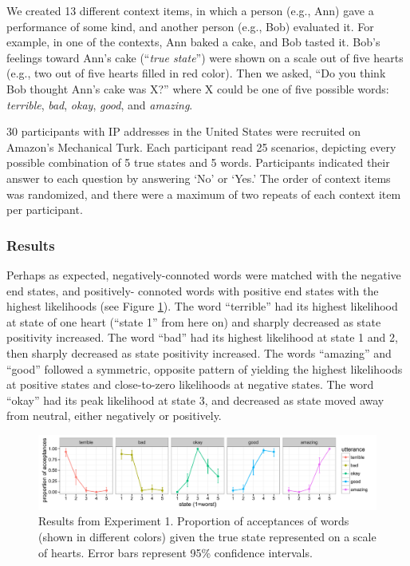\documentclass[10pt,letterpaper]{article}
\begin{document}
We created 13 different context items, in which a person (e.g., Ann) gave a performance of some kind, and another person (e.g., Bob) evaluated it. For example, in one of the contexts, Ann baked a cake, and Bob tasted it. Bob's feelings toward Ann's cake (``\emph{true state}'') were shown on a scale out of five hearts (e.g., two out of five hearts filled in red color). Then we asked, ``Do you think Bob thought Ann's cake was X?'' where X could be one of five possible words: \emph{terrible}, \emph{bad}, \emph{okay}, \emph{good}, and \emph{amazing}.

30 participants with IP addresses in the United States were recruited on Amazon's Mechanical Turk. Each participant read 25 scenarios, depicting every possible combination of 5 true states and 5 words. Participants indicated their answer to each question by answering `No' or `Yes.' The order of context items was randomized, and there were a maximum of two repeats of each context item per participant.

\subsubsection{Results}

Perhaps as expected, negatively-connoted words were matched with the negative end states, and positively- connoted words with positive end states with the highest likelihoods (see Figure \ref{fig:exp1}). The word ``terrible'' had its highest likelihood at state of one heart (``state 1'' from here on) and sharply decreased as state positivity increased. The word ``bad'' had its highest likelihood at state 1 and 2, then sharply decreased as state positivity increased. The words ``amazing'' and ``good'' followed a symmetric, opposite pattern of yielding the highest likelihoods at positive states and close-to-zero likelihoods at negative states. The word ``okay'' had its peak likelihood at state 3, and decreased as state moved away from neutral, either negatively or positively.

\begin{figure}[t]
\begin{center} 
  \includegraphics[width=.9\textwidth]{figures/exp1.pdf}
  \caption{\label{fig:exp1} Results from Experiment 1. Proportion of acceptances of words (shown in different colors) given the true state represented on a scale of hearts. Error bars represent 95\% confidence intervals.}
  \end{center} 
\end{figure}
\end{document}
